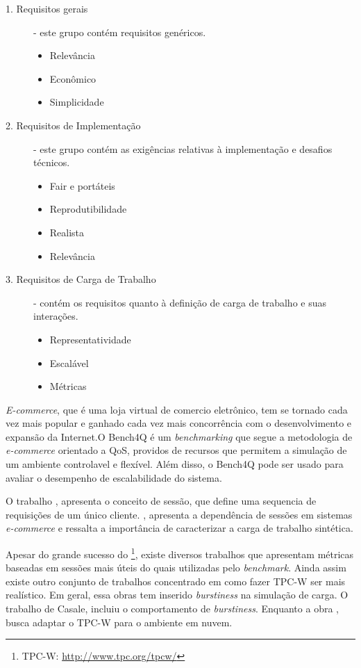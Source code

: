 \begin{description}
	\item[1. Requisitos gerais] - este grupo contém requisitos genéricos. 
	\begin{itemize}
		\item Relevância
		\item Econômico
		\item Simplicidade
	\end{itemize}
	
	\item[2. Requisitos de Implementação] - este grupo contém as exigências relativas à implementação e desafios técnicos. \hfill 
	\begin{itemize}
		\item Fair e portáteis
		\item Reprodutibilidade
		\item Realista
		\item Relevância
	\end{itemize}
	
	\item[3. Requisitos de Carga de Trabalho ] - contém os requisitos quanto à definição de carga de trabalho e suas interações. \hfill 
	\begin{itemize}
		\item Representatividade
		\item Escalável
		\item Métricas
	\end{itemize}
	
\end{description}


\textit{E-commerce}, que é uma loja virtual de comercio eletrônico, tem se tornado cada vez mais popular e ganhado cada vez mais concorrência com o desenvolvimento e expansão da Internet.O Bench4Q é um \textit{benchmarking} que segue a metodologia de \textit{e-commerce} orientado a QoS, providos de recursos que permitem a simulação de um ambiente controlavel e flexível. Além disso, o Bench4Q pode ser usado para avaliar o desempenho de escalabilidade do sistema.

O trabalho \cite{cherkasova1998}, apresenta o conceito de sessão, que define uma sequencia de requisições de um único cliente. \cite{Krishnamurthy2006}, apresenta a dependência de sessões em sistemas \textit{e-commerce} e ressalta a importância de caracterizar a carga de trabalho sintética.

Apesar do grande sucesso do  \footnote{TPC-W: \url{http://www.tpc.org/tpcw/}}, existe diversos trabalhos que apresentam métricas baseadas em sessões mais úteis do quais utilizadas pelo \textit{benchmark}. Ainda assim existe outro conjunto de trabalhos concentrado em como fazer TPC-W ser mais realístico. Em geral, essa obras tem inserido \textit{burstiness} na simulação de carga. O trabalho \cite{Mi2009} de Casale, incluiu o comportamento de \textit{burstiness}. Enquanto a obra \cite{Sobel2008}, busca adaptar o TPC-W para o ambiente em nuvem.

